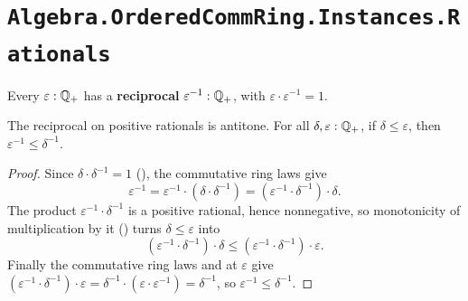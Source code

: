 \section{\texttt{Algebra.OrderedCommRing.Instances.Rationals}}


\begin{definition}
  \label{invPos}
  Every $\varepsilon : \mathbb{Q}_{+}$ has a \textbf{reciprocal} $\varepsilon^{-1} : \mathbb{Q}_{+}$, with $\varepsilon \cdot \varepsilon^{-1} = 1$.
\end{definition}

\begin{lemma}
  \label{invPosFlipLe}
  The reciprocal on positive rationals is antitone. For all $\delta, \varepsilon : \mathbb{Q}_{+}$, if $\delta \le \varepsilon$, then $\varepsilon^{-1} \le \delta^{-1}$.
\end{lemma}
\begin{proof}
  Since $\delta \cdot \delta^{-1} = 1$ (), the commutative ring laws give
  \[
    \varepsilon^{-1} = \varepsilon^{-1} \cdot (\delta \cdot \delta^{-1}) = (\varepsilon^{-1} \cdot \delta^{-1}) \cdot \delta.
  \]
  The product $\varepsilon^{-1} \cdot \delta^{-1}$ is a positive rational, hence nonnegative, so monotonicity of multiplication by it () turns $\delta \le \varepsilon$ into
  \[
    (\varepsilon^{-1} \cdot \delta^{-1}) \cdot \delta \le (\varepsilon^{-1} \cdot \delta^{-1}) \cdot \varepsilon.
  \]
  Finally the commutative ring laws and  at $\varepsilon$ give $(\varepsilon^{-1} \cdot \delta^{-1}) \cdot \varepsilon = \delta^{-1} \cdot (\varepsilon \cdot \varepsilon^{-1}) = \delta^{-1}$, so $\varepsilon^{-1} \le \delta^{-1}$.
\end{proof}
